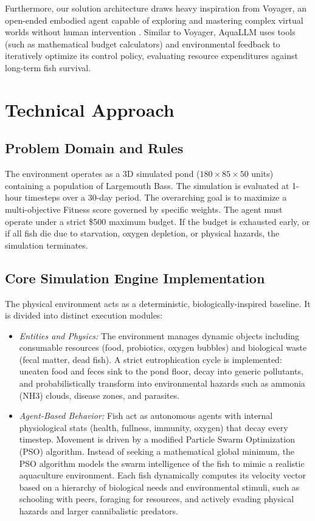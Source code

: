 \documentclass[conference]{IEEEtran}
\begin{document}
Furthermore, our solution architecture draws heavy inspiration from Voyager, an open-ended embodied agent capable of exploring and mastering complex virtual worlds without human intervention \cite{wang2023}. Similar to Voyager, AquaLLM uses tools (such as mathematical budget calculators) and environmental feedback to iteratively optimize its control policy, evaluating resource expenditures against long-term fish survival.

\section{Technical Approach}

\subsection{Problem Domain and Rules}
The environment operates as a 3D simulated pond ($180 \times 85 \times 50$ units) containing a population of Largemouth Bass. The simulation is evaluated at 1-hour timesteps over a 30-day period. The overarching goal is to maximize a multi-objective Fitness score governed by specific weights. The agent must operate under a strict \$500 maximum budget. If the budget is exhausted early, or if all fish die due to starvation, oxygen depletion, or physical hazards, the simulation terminates.

\subsection{Core Simulation Engine Implementation}
The physical environment acts as a deterministic, biologically-inspired baseline. It is divided into distinct execution modules:
\begin{itemize}
    \item \textit{Entities and Physics:} The environment manages dynamic objects including consumable resources (food, probiotics, oxygen bubbles) and biological waste (fecal matter, dead fish). A strict eutrophication cycle is implemented: uneaten food and feces sink to the pond floor, decay into generic pollutants, and probabilistically transform into environmental hazards such as ammonia (NH3) clouds, disease zones, and parasites.
    \item \textit{Agent-Based Behavior:} Fish act as autonomous agents with internal physiological stats (health, fullness, immunity, oxygen) that decay every timestep. Movement is driven by a modified Particle Swarm Optimization (PSO) algorithm. Instead of seeking a mathematical global minimum, the PSO algorithm models the swarm intelligence of the fish to mimic a realistic aquaculture environment. Each fish dynamically computes its velocity vector based on a hierarchy of biological needs and environmental stimuli, such as schooling with peers, foraging for resources, and actively evading physical hazards and larger cannibalistic predators.
\end{itemize}
\end{document}
